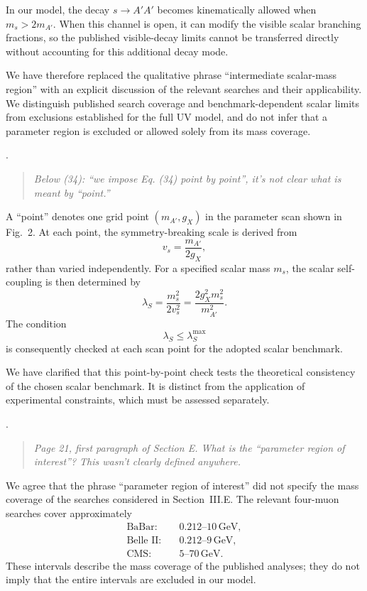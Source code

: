 \documentclass[12pt,a4paper]{article}
\begin{document}
In our model, the decay \(s\to A'A'\) becomes kinematically allowed when \(m_s>2m_{A'}\). When this channel is open, it can modify the visible scalar branching fractions, so the published visible-decay limits cannot be transferred directly without accounting for this additional decay mode.

We have therefore replaced the qualitative phrase ``intermediate scalar-mass region'' with an explicit discussion of the relevant searches and their applicability. We distinguish published search coverage and benchmark-dependent scalar limits from exclusions established for the full UV model, and do not infer that a parameter region is excluded or allowed solely from its mass coverage.

\medskip
{}. \begin{quote}\itshape
Below (34): ``we impose Eq. (34) point by point'', it's not clear what is meant by ``point.''
\end{quote}

A ``point'' denotes one grid point \((m_{A'},g_X)\) in the parameter scan shown in Fig.~2. At each point, the symmetry-breaking scale is derived from
\[
v_s=\frac{m_{A'}}{2g_X},
\]
rather than varied independently. For a specified scalar mass \(m_s\), the scalar self-coupling is then determined by
\[
\lambda_S
=\frac{m_s^2}{2v_s^2}
=\frac{2g_X^2m_s^2}{m_{A'}^2}.
\]
The condition
\[
\lambda_S\leq\lambda_S^{\max}
\]
is consequently checked at each scan point for the adopted scalar benchmark.

We have clarified that this point-by-point check tests the theoretical consistency of the chosen scalar benchmark. It is distinct from the application of experimental constraints, which must be assessed separately.

\medskip
{}. \begin{quote}\itshape
Page 21, first paragraph of Section E. What is the ``parameter region of interest''? This wasn't clearly defined anywhere.
\end{quote}

We agree that the phrase ``parameter region of interest'' did not specify the mass coverage of the searches considered in Section~III.E. The relevant four-muon searches cover approximately
\[
\begin{aligned}
\text{BaBar}:&\quad 0.212\text{--}10\,\mathrm{GeV},\\
\text{Belle II}:&\quad 0.212\text{--}9\,\mathrm{GeV},\\
\text{CMS}:&\quad 5\text{--}70\,\mathrm{GeV}.
\end{aligned}
\]
These intervals describe the mass coverage of the published analyses; they do not imply that the entire intervals are excluded in our model.
\end{document}
